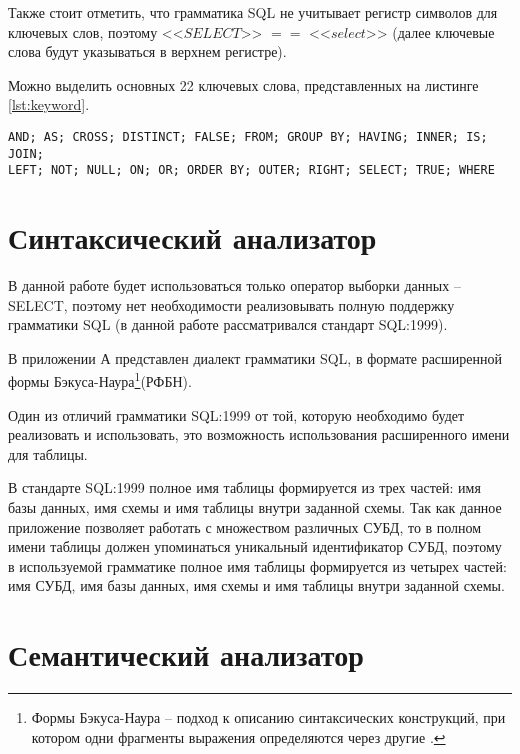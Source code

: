 \newpage

Также стоит отметить, что грамматика SQL не учитывает регистр символов для ключевых слов, поэтому <<$SELECT$>> $==$ <<$select$>> (далее ключевые слова будут указываться в верхнем регистре). 

Можно выделить основных 22 ключевых слова, представленных на листинге \ref{lst:keyword}.

\begin{lstlisting}[label=lst:keyword,caption=Основные ключевые слова языка SQL]
AND; AS; CROSS; DISTINCT; FALSE; FROM; GROUP BY; HAVING; INNER; IS; JOIN; 
LEFT; NOT; NULL; ON; OR; ORDER BY; OUTER; RIGHT; SELECT; TRUE; WHERE
\end{lstlisting}

\section{Синтаксический анализатор}

В данной работе будет использоваться только оператор выборки данных -- SELECT, поэтому нет необходимости реализовывать полную поддержку грамматики SQL (в данной работе рассматривался стандарт SQL:1999).

В приложении А представлен диалект грамматики SQL, в формате расширенной формы Бэкуса-Наура\footnote{Формы Бэкуса-Наура -- подход к описанию синтаксических конструкций, при котором одни фрагменты выражения определяются через другие \cite{rfbn}.}(РФБН).



Один из отличий грамматики SQL:1999 от той, которую необходимо будет реализовать и использовать, это возможность использования расширенного имени для таблицы. 

В стандарте SQL:1999 полное имя таблицы формируется из трех частей: имя базы данных, имя схемы и имя таблицы внутри заданной схемы. Так как данное приложение позволяет работать с множеством различных СУБД, то в полном имени таблицы должен упоминаться уникальный идентификатор СУБД, поэтому в используемой грамматике полное имя таблицы формируется из четырех частей: имя СУБД, имя базы данных, имя схемы и имя таблицы внутри заданной схемы.


\section{Семантический анализатор}

